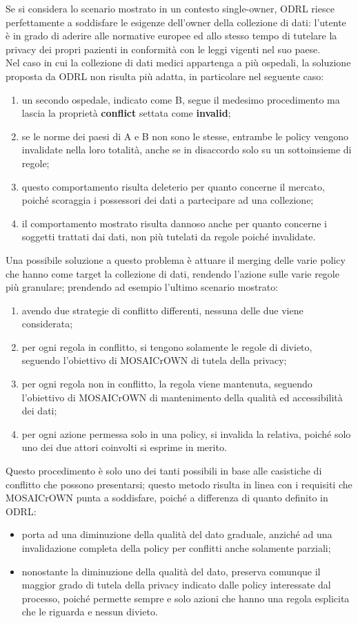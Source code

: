\documentclass[12pt,a4paper,twoside]{book}
\begin{document}
Se si considera lo scenario mostrato in un contesto single-owner, ODRL riesce perfettamente a soddisfare le esigenze dell'owner della collezione di dati: l'utente è in grado di aderire alle normative europee ed allo stesso tempo di tutelare la privacy dei propri pazienti in conformità con le leggi vigenti nel suo paese.\\
Nel caso in cui la collezione di dati medici appartenga a più ospedali, la soluzione proposta da ODRL non risulta più adatta, in particolare nel seguente caso:
\begin{enumerate}
	\item un secondo ospedale, indicato come B, segue il medesimo procedimento ma lascia la proprietà \textbf{conflict} settata come \textbf{invalid};
	\item se le norme dei paesi di A e B non sono le stesse, entrambe le policy vengono invalidate nella loro totalità, anche se in disaccordo solo su un sottoinsieme di regole;
	\item questo comportamento risulta deleterio per quanto concerne il mercato, poiché scoraggia i possessori dei dati a partecipare ad una collezione; \item il comportamento mostrato risulta dannoso anche per quanto concerne i soggetti trattati dai dati, non più tutelati da regole poiché invalidate.
\end{enumerate}
Una possibile soluzione a questo problema è attuare il merging delle varie policy che hanno come target la collezione di dati, rendendo l'azione sulle varie regole più granulare; prendendo ad esempio l'ultimo scenario mostrato:
\begin{enumerate}
	\item avendo due strategie di conflitto differenti, nessuna delle due viene considerata;
	\item per ogni regola in conflitto, si tengono solamente le regole di divieto, seguendo l'obiettivo di MOSAICrOWN di tutela della privacy;
	\item per ogni regola non in conflitto, la regola viene mantenuta, seguendo l'obiettivo di MOSAICrOWN di mantenimento della qualità ed accessibilità dei dati;
	\item per ogni azione permessa solo in una policy, si invalida la relativa, poiché solo uno dei due attori coinvolti si esprime in merito.
\end{enumerate}
Questo procedimento è solo uno dei tanti possibili in base alle casistiche di conflitto che possono presentarsi; questo metodo risulta in linea con i requisiti che MOSAICrOWN punta a soddisfare, poiché a differenza di quanto definito in ODRL:
\begin{itemize}
	\item porta ad una diminuzione della qualità del dato graduale, anziché ad una invalidazione completa della policy per conflitti anche solamente parziali;
	\item nonostante la diminuzione della qualità del dato, preserva comunque il maggior grado di tutela della privacy indicato dalle policy interessate dal processo, poiché permette sempre e solo azioni che hanno una regola esplicita che le riguarda e nessun divieto.
\end{itemize}
\end{document}
